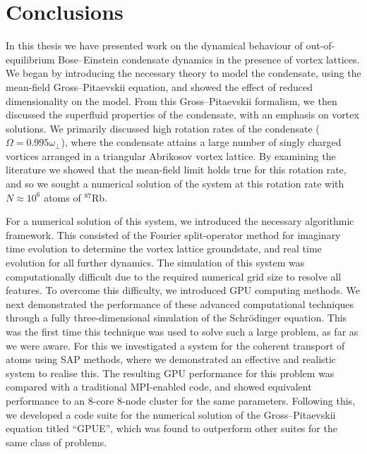 
\section{Conclusions}
In this thesis we have presented work on the dynamical behaviour of out-of-equilibrium Bose--Einstein condensate dynamics in the presence of vortex lattices. We began by introducing the necessary theory to model the condensate, using the mean-field Gross--Pitaevskii equation, and showed the effect of reduced dimensionality on the model. From this Gross--Pitaevskii formalism, we then discussed the superfluid properties of the condensate, with an emphasis on vortex solutions. We primarily discussed high rotation rates of the condensate ($\Omega = 0.995\omega_\perp$), where the condensate attains a large number of singly charged vortices arranged in a triangular Abrikosov vortex lattice. By examining the literature we showed that the mean-field limit holds true for this rotation rate, and so we sought a numerical solution of the system at this rotation rate with $N\approx 10^{6}$ atoms of $^{87}$Rb.

For a numerical solution of this system, we introduced the necessary algorithmic framework. This consisted of the Fourier split-operator method for imaginary time evolution to determine the vortex lattice groundstate, and real time evolution for all further dynamics. The simulation of this system was computationally difficult due to the required numerical grid size to resolve all features. To overcome this difficulty, we introduced GPU computing methods. We next demonstrated the performance of these advanced computational techniques through a fully three-dimensional simulation of the Schr\"odinger equation. This was the first time this technique was used to solve such a large problem, as far as we were aware. For this we investigated a system for the coherent transport of atoms using SAP methods, where we demonstrated an effective and realistic system to realise this. The resulting GPU performance for this problem was compared with a traditional MPI-enabled code, and showed equivalent performance to an 8-core 8-node cluster for the same parameters. Following this, we developed a code suite for the numerical solution of the Gross--Pitaevskii equation titled ``GPUE'', which was found to outperform other suites for the same class of problems.


